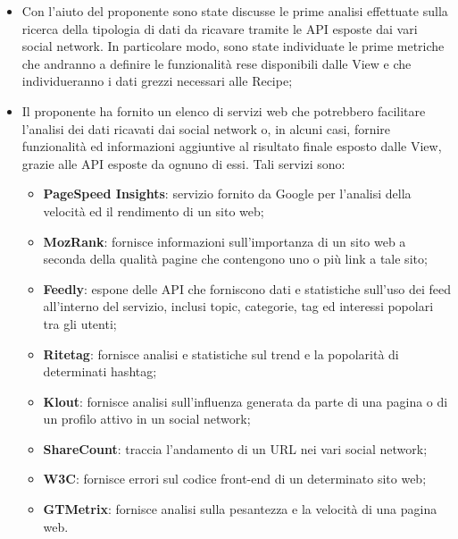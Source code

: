 \begin{itemize}
  \item Con l'aiuto del proponente sono state discusse le prime analisi effettuate sulla ricerca della tipologia
  di dati da ricavare tramite le API esposte dai vari social network. In particolare modo, sono state individuate
  le prime metriche che andranno a definire le funzionalità rese disponibili dalle View e che individueranno i dati
  grezzi necessari alle Recipe;
  \item Il proponente ha fornito un elenco di servizi web che potrebbero facilitare l'analisi dei dati ricavati dai
  social network o, in alcuni casi, fornire funzionalità ed informazioni aggiuntive al risultato finale esposto
  dalle View, grazie alle API esposte da ognuno di essi. Tali servizi sono:
  \begin{itemize}
    \item \textbf{PageSpeed Insights}: servizio fornito da Google per l'analisi della velocità ed il rendimento di un sito web;
    \item \textbf{MozRank}: fornisce informazioni sull'importanza di un sito web a seconda della qualità pagine che contengono uno o più link a tale sito;
    \item \textbf{Feedly}: espone delle API che forniscono dati e statistiche sull'uso dei feed all'interno del servizio, inclusi topic, categorie, tag ed interessi popolari tra gli utenti;
    \item \textbf{Ritetag}: fornisce analisi e statistiche sul trend e la popolarità di determinati hashtag;
    \item \textbf{Klout}: fornisce analisi sull'influenza generata da parte di una pagina o di un profilo attivo in un social network;
    \item \textbf{ShareCount}: traccia l'andamento di un URL nei vari social network;
    \item \textbf{W3C}: fornisce errori sul codice front-end di un determinato sito web;
    \item \textbf{GTMetrix}: fornisce analisi sulla pesantezza e la velocità di una pagina web.
  \end{itemize}
\end{itemize}
